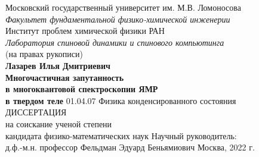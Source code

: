 \begin{titlepage}
\begin{center}
  {\large Московский государственный университет им. М.В. Ломоносова} \\
  {\it Факультет фундаментальной физико-химической инженерии} \\
  \vspace{1cm}
  {\large Институт проблем химической физики РАН} \\
  {\it Лаборатория спиновой динамики и спинового компьютинга} \\
  \vfill
  (на правах рукописи) \\
  \vfill
  {\Large \bf Лазарев Илья Дмитриевич} \\
  \vspace{1cm}
  {\Large \bf
      Многочастичная запутанность \\
      в многоквантовой спектроскопии ЯМР \\
      \vspace{2mm}
      в твердом теле
  }
 \vfill
 01.04.07 Физика конденсированного состояния \\
 \vspace{1cm}
 ДИССЕРТАЦИЯ \\
 на соискание ученой степени \\
 кандидата физико-математических наук
 \vfill
 {\large
   Научный руководитель:\\
   д.ф.-м.н. профессор Фельдман Эдуард Беньямиович
 }
 \vfill
 Москва, 2022 г.
\end{center}
\end{titlepage}